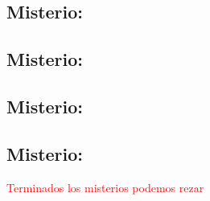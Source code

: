 \documentclass[10pt,twoside]{book}
\newcounter{glorious-counter}
\begin{document}
\begin{center}
      
\end{center}

\subsection*{ Misterio: }


\begin{center}
      
\end{center}

\subsection*{ Misterio: }


\begin{center}
      
\end{center}

\subsection*{ Misterio: }


\begin{center}
      
\end{center}

\subsection*{ Misterio: }


\begin{center}
      {}
\end{center}
\label{final-prayer}
\begin{center}
      \textcolor{red}{Terminados los misterios podemos rezar}
\end{center}
\end{document}

